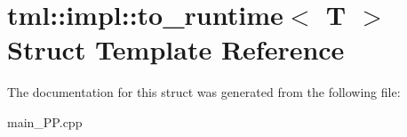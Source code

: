 \hypertarget{structtml_1_1impl_1_1to__runtime}{\section{tml\+:\+:impl\+:\+:to\+\_\+runtime$<$ T $>$ Struct Template Reference}
\label{structtml_1_1impl_1_1to__runtime}
}


The documentation for this struct was generated from the following file\+:\begin{DoxyCompactItemize}
\item 
main\+\_\+\+P\+P.\+cpp\end{DoxyCompactItemize}
